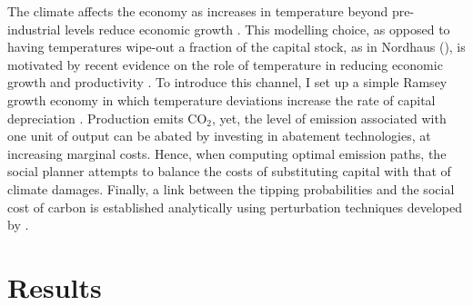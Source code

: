 \documentclass[12pt]{article}
\begin{document}
The climate affects the economy as increases in temperature beyond pre-industrial levels reduce economic growth \citep{pindyck_economic_2013, hambel_optimal_2021}. This modelling choice, as opposed to having temperatures wipe-out a fraction of the capital stock, as in Nordhaus (\citeyear{nordhaus_question_2008, nordhaus_estimates_2014,nordhaus_revisiting_2017}), is motivated by recent evidence on the role of temperature in reducing economic growth and productivity \citep{burke_global_2015, dietz_growth_2019}. To introduce this channel, I set up a simple Ramsey growth economy in which temperature deviations increase the rate of capital depreciation \citep{hambel_optimal_2021}. Production emits CO$_2$, yet, the level of emission associated with one unit of output can be abated by investing in abatement technologies, at increasing marginal costs. Hence, when computing optimal emission paths, the social planner attempts to balance the costs of substituting capital with that of climate damages. Finally, a link between the tipping probabilities and the social cost of carbon is established analytically using perturbation techniques developed by \cite{grass_small-noise_2015}.

\section{Results}
\end{document}
